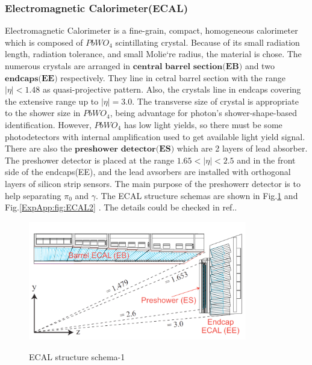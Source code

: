 		\subsubsection{Electromagnetic Calorimeter(ECAL)}
		\label{sssec:ecal}

			Electromagnetic Calorimeter is a fine-grain, compact, homogeneous calorimeter which is composed of $PbWO_4$ scintillating crystal. Because of its small radiation length, radiation tolerance, and small Molie`re radius, the material is chose. The numerous crystals are arranged in $\textbf{central}$ $\textbf{barrel}$ $\textbf{section}$$\textbf{(EB)}$ and two $\textbf{endcaps}$$\textbf{(EE)}$ respectively. They line in cetral barrel section with the range $|\eta|<1.48$ as quasi-projective pattern. Also, the crystals line in endcaps covering the extensive range up to $|\eta|=3.0$. The transverse size of crystal is appropriate to the shower size in $PbWO_4$, being advantage for photon's shower-shape-based identification. However, $PbWO_4$ has low light yields, so there must be some photodetectors with internal amplification used to get available light yield signal. There are also the $\textbf{preshower}$ $\textbf{detector}$$\textbf{(ES)}$ which are 2 layers of lead absorber. The preshower detector is placed at the range $1.65<|\eta|<2.5$ and in the front side of the endcaps(EE), and the lead avsorbers are installed with orthogonal layers of silicon strip sensors. The main purpose of the preshowerr detector is to help separating $\pi_0$ and $\gamma$. The ECAL structure schemas are shown in Fig.\ref{ExpApp:fig:ECAL1} and Fig.\ref{ExpApp:fig:ECAL2} . The details could be checked in ref.\cite{ECAL_ex}.


			\begin{figure}[H]
			\centering{}
		    	\includegraphics[width=0.85\textwidth]{Figures/ExpApparatus/ECAL.png}\\
			\caption{ECAL structure schema-1\cite{ECAL_ex}}
			\label{ExpApp:fig:ECAL1}
			\end{figure}
			\FloatBarrier

